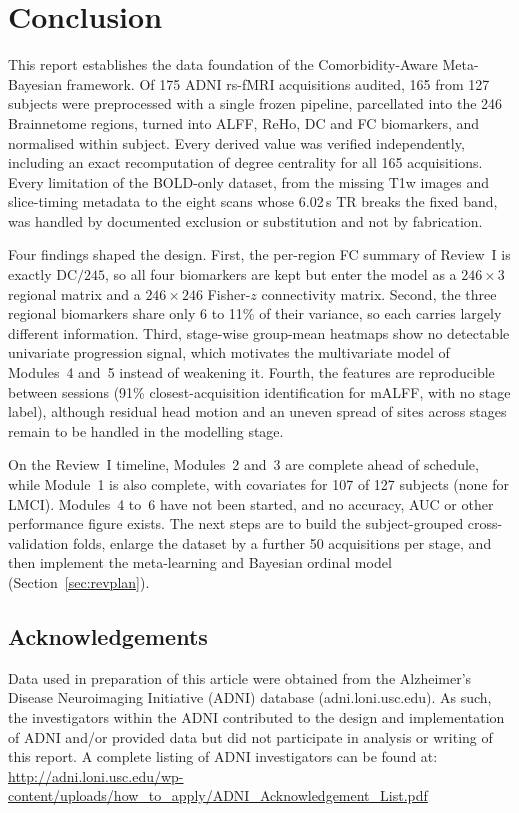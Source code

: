 \documentclass{ssnreview}
\begin{document}
\chapter{Conclusion}\label{ch:conclusion}

This report establishes the data foundation of the Comorbidity-Aware Meta-Bayesian
framework. Of 175 ADNI rs-fMRI acquisitions audited, 165 from 127 subjects were
preprocessed with a single frozen pipeline, parcellated into the 246 Brainnetome regions,
turned into ALFF, ReHo, DC and FC biomarkers, and normalised within subject. Every derived
value was verified independently, including an exact recomputation of degree centrality for
all 165 acquisitions. Every limitation of the BOLD-only dataset, from the missing T1w images
and slice-timing metadata to the eight scans whose 6.02\,s TR breaks the fixed band, was
handled by documented exclusion or substitution and not by fabrication.

Four findings shaped the design. First, the per-region FC summary of Review~I is exactly
DC$/245$, so all four biomarkers are kept but enter the model as a $246\times3$ regional
matrix and a $246\times246$ Fisher-$z$ connectivity matrix. Second, the three regional
biomarkers share only 6 to 11\% of their variance, so each carries largely different
information. Third, stage-wise group-mean heatmaps show no detectable univariate progression
signal, which motivates the multivariate model of Modules~4 and~5 instead of weakening it.
Fourth, the features are reproducible between sessions (91\% closest-acquisition identification
for mALFF, with no stage label), although residual head motion and an uneven spread of sites
across stages remain to be handled in the modelling stage.

On the Review~I timeline, Modules~2 and~3 are complete ahead of schedule, while
Module~1 is also complete, with covariates for 107 of 127 subjects (none for LMCI). Modules~4 to~6 have not been started, and no
accuracy, AUC or other performance figure exists. The next steps are to build the subject-grouped cross-validation folds,
enlarge the dataset by a further 50 acquisitions per stage, and then implement the
meta-learning and Bayesian ordinal model (Section~\ref{sec:revplan}).

\section*{Acknowledgements}
Data used in preparation of this article were obtained from the Alzheimer's Disease
Neuroimaging Initiative (ADNI) database (adni.loni.usc.edu). As such, the investigators
within the ADNI contributed to the design and implementation of ADNI and/or provided data
but did not participate in analysis or writing of this report. A complete listing of ADNI
investigators can be found at:
\url{http://adni.loni.usc.edu/wp-content/uploads/how_to_apply/ADNI_Acknowledgement_List.pdf}
\end{document}

